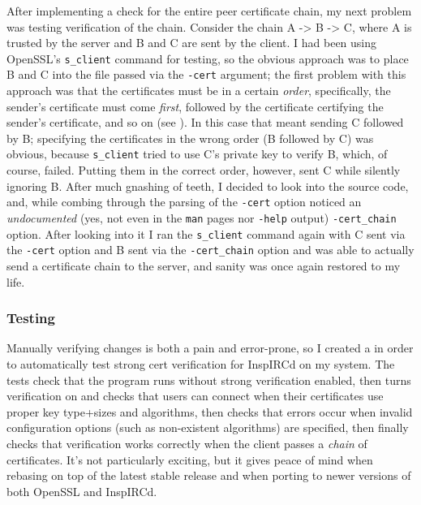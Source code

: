 \documentclass{article}
\begin{document}
After implementing a check for the entire peer certificate chain, my next problem was testing verification of the chain.  Consider the chain A -> B -> C, where A is trusted by the server and B and C are sent by the client.  I had been using OpenSSL's \texttt{s_client} command for testing, so the obvious approach was to place B and C into the file passed via the \texttt{-cert} argument; the first problem with this approach was that the certificates must be in a certain \emph{order}, specifically, the sender's certificate must come \emph{first}, followed by the certificate certifying the sender's certificate, and so on (see ).  In this case that meant sending C followed by B; specifying the certificates in the wrong order (B followed by C) was obvious, because \texttt{s_client} tried to use C's private key to verify B, which, of course, failed.  Putting them in the correct order, however, sent C while silently ignoring B.  After much gnashing of teeth, I decided to look into the source code, and, while combing through the parsing of the \texttt{-cert} option noticed an \emph{undocumented} (yes, not even in the \texttt{man} pages nor \texttt{-help} output) \texttt{-cert_chain} option.  After looking into it I ran the \texttt{s_client} command again with C sent via the \texttt{-cert} option and B sent via the \texttt{-cert_chain} option and was able to actually send a certificate chain to the server, and sanity was once again restored to my life.

\subsubsection{Testing}
Manually verifying changes is both a pain and error-prone, so I created a  in order to automatically test strong cert verification for InspIRCd on my system.  The tests check that the program runs without strong verification enabled, then turns verification on and checks that users can connect when their certificates use proper key type+sizes and algorithms, then checks that errors occur when invalid configuration options (such as non-existent algorithms) are specified, then finally checks that verification works correctly when the client passes a \emph{chain} of certificates.  It's not particularly exciting, but it gives peace of mind when rebasing on top of the latest stable release and when porting to newer versions of both OpenSSL and InspIRCd.
\end{document}
